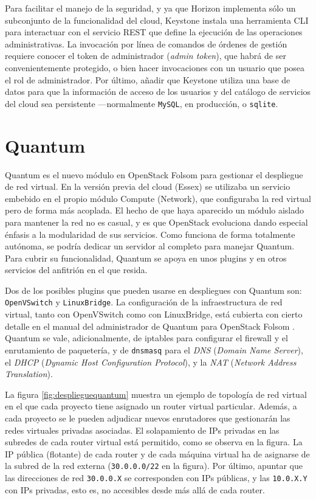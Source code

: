 Para facilitar el manejo de la seguridad, y ya que Horizon implementa s\'olo un subconjunto de la funcionalidad del cloud, Keystone instala una he\-rra\-mien\-ta CLI para interactuar con el servicio REST que define la ejecuci\'on de las operaciones administrativas. La invocaci\'on por l\'inea de comandos de \'ordenes de gesti\'on requiere conocer el token de administrador (\emph{admin token}), que habr\'a de ser convenientemente protegido, o bien hacer invocaciones con un usuario que posea el rol de ad\-mi\-nis\-tra\-dor. Por \'ultimo, a\~nadir que Keystone utiliza una base de datos para que la informaci\'on de acceso de los usuarios y del cat\'alogo de servicios del cloud sea persistente ---normalmente \texttt{MySQL}, en producci\'on, o \texttt{sqlite}.


\section{Quantum}\label{sec:quantum}
\noindent Quantum es el nuevo m\'odulo en OpenStack Folsom para gestionar el des\-plie\-gue de red virtual. En la versi\'on previa del cloud (Essex) se utilizaba un servicio embebido en el propio m\'odulo Compute (Network), que configuraba la red virtual pero de forma m\'as acoplada. El hecho de que haya aparecido un m\'odulo aislado para mantener la red no es casual, y es que OpenStack evoluciona dando especial \'enfasis a la modularidad de sus servicios. Como funciona de forma totalmente aut\'onoma, se podr\'ia dedicar un servidor al completo para manejar Quantum. Para cubrir su funcionalidad, Quantum se apoya en unos plugins y en otros servicios del anfitri\'on en el que resida.\newline

Dos de los posibles plugins que pueden usarse en despliegues con Quantum son: \texttt{OpenVSwitch} y \texttt{LinuxBridge}. La configuraci\'on de la infraestructura de red virtual, tanto con OpenVSwitch como con LinuxBridge, est\'a cubierta con cierto detalle en el manual del administrador de Quantum para OpenStack Folsom \cite{quantumadminfolsom}. Quantum se vale, adicionalmente, de iptables para con\-fi\-gu\-rar el firewall y el enrutamiento de paqueter\'ia, y de \texttt{dnsmasq} para el \emph{DNS} (\emph{Domain Name Server}), el \emph{DHCP} (\emph{Dynamic Host Configuration Protocol}), y la \emph{NAT} (\emph{Network Address Translation}).\newline

La figura \ref{fig:desplieguequantum} muestra un ejemplo de topolog\'ia de red virtual en el que cada proyecto tiene asignado un router virtual particular. Adem\'as, a cada proyecto se le pueden adjudicar nuevos enrutadores que gestionar\'an las redes virtuales privadas asociadas. El solapamiento de IPs privadas en las subredes de cada router virtual est\'a permitido, como se observa en la figura. La IP p\'ublica (flotante) de cada router y de cada m\'aquina virtual ha de asignarse de la subred de la red externa (\texttt{30.0.0.0/22} en la figura). Por \'ultimo, apuntar que las direcciones de red \texttt{30.0.0.X} se corresponden con IPs p\'ublicas, y las \texttt{10.0.X.Y} con IPs privadas, esto es, no accesibles desde m\'as all\'a de cada router.\newline

